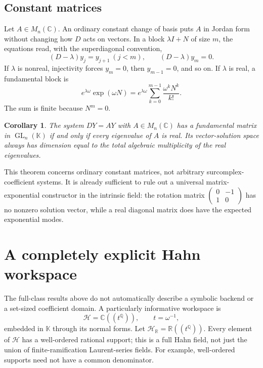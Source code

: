 \documentclass[11pt,a4paper]{article}
\numberwithin{equation}{section}
\newtheorem{corollary}[theorem]{Corollary}
\theoremstyle{definition}
\theoremstyle{remark}
\newcommand{\K}{\mathbb K}
\newcommand{\C}{\mathbb C}
\newcommand{\R}{\mathbb R}
\newcommand{\Q}{\mathbb Q}
\newcommand{\HH}{\mathscr H}
\begin{document}
\subsection{Constant matrices}

Let $A\in M_n(\C)$. An ordinary constant change of basis puts $A$ in
Jordan form without changing how $D$ acts on vectors. In a block
$\lambda I+N$ of size $m$, the equations read, with the superdiagonal
convention,
\[
 (D-\lambda)y_j=y_{j+1}\ (j<m),\qquad
 (D-\lambda)y_m=0.
\]
If $\lambda$ is nonreal, injectivity forces $y_m=0$, then $y_{m-1}=0$,
and so on. If $\lambda$ is real, a fundamental block is
\[
 e^{\lambda\omega}\exp(\omega N)
 =e^{\lambda\omega}\sum_{k=0}^{m-1}\frac{\omega^kN^k}{k!}.
\]
The sum is finite because $N^m=0$.

\begin{corollary}\label{cor:matrix}
The system $DY=AY$ with $A\in M_n(\C)$ has a fundamental matrix in
$\operatorname{GL}_n(\K)$ if and only if every eigenvalue of $A$ is real.
Its vector-solution space always has dimension equal to the total algebraic
multiplicity of the real eigenvalues.
\end{corollary}

This theorem concerns ordinary constant matrices, not arbitrary
surcomplex-coefficient systems. It is already sufficient to rule out a
universal matrix-exponential constructor in the intrinsic field: the
rotation matrix
$\left(\begin{smallmatrix}0&-1\\1&0\end{smallmatrix}\right)$
has no nonzero solution vector, while a real diagonal matrix does have the
expected exponential modes.

\section{A completely explicit Hahn workspace}
\label{sec:hahn}

The full-class results above do not automatically describe a symbolic
backend or a set-sized coefficient domain. A particularly informative
workspace is
\begin{equation}\label{eq:HahnQ}
 \HH=\C((t^\Q)),\qquad t=\omega^{-1},
\end{equation}
embedded in $\K$ through its normal forms. Let $\HH_\R=\R((t^\Q))$.
Every element of $\HH$ has a well-ordered rational support; this is a full
Hahn field, not just the union of finite-ramification Laurent-series fields.
For example, well-ordered supports need not have a common denominator.
\end{document}
